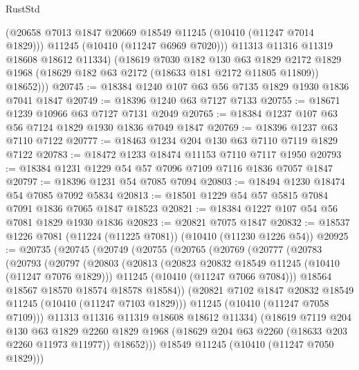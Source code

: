 \begin{lexlean}{RustStd}
\begin{coremodule}
            (@20658 @7013 @1847 @20669 @18549 @11245 (@10410 (@11247 @7014 @1829)))
            @11245
            (@10410 (@11247 @6969 @7020)))
          @11313
          @11316
          @11319
          @18608
          @18612
          @11334)
        (@18619
          @7030
          @182
          @130
          @63
          @1829
          @2172
          @1829
          @1968
          (@18629 @182 @63 @2172 (@18633 @181 @2172 @11805 @11809))
          @18652)))
@20745 := @18384 @1240 @107 @63 @56 @7135 @1829 @1930 @1836 @7041 @1847
@20749 := @18396 @1240 @63 @7127 @7133
@20755 := @18671 @1239 @10966 @63 @7127 @7131 @2049
@20765 := @18384 @1237 @107 @63 @56 @7124 @1829 @1930 @1836 @7049 @1847
@20769 := @18396 @1237 @63 @7110 @7122
@20777 := @18463 @1234 @204 @130 @63 @7110 @7119 @1829 @7122
@20783 := @18472 @1233 @18474 @11153 @7110 @7117 @1950
@20793 := @18384 @1231 @1229 @54 @57 @7096 @7109 @7116 @1836 @7057 @1847
@20797 := @18396 @1231 @54 @7085 @7094
@20803 := @18494 @1230 @18474 @54 @7085 @7092 @5834
@20813 := @18501 @1229 @54 @57 @5815 @7084 @7091 @1836 @7065 @1847 @18523
@20821 := @18384 @1227 @107 @54 @56 @7081 @1829 @1930 @1836
@20823 := @20821 @7075 @1847
@20832 := @18537 @1226 @7081 (@11224 (@11225 @7081)) (@10410 (@11230 @1226 @54))
@20925 := @20735
    (@20745
      (@20749
        (@20755
          (@20765
            (@20769
              (@20777
                (@20783
                  (@20793
                    (@20797
                      (@20803
                        (@20813
                          (@20823 @20832 @18549 @11245 (@10410 (@11247 @7076 @1829)))
                          @11245
                          (@10410 (@11247 @7066 @7084)))
                        @18564
                        @18567
                        @18570
                        @18574
                        @18578
                        @18584))
                    (@20821 @7102 @1847 @20832 @18549 @11245 (@10410 (@11247 @7103 @1829)))
                    @11245
                    (@10410 (@11247 @7058 @7109)))
                  @11313
                  @11316
                  @11319
                  @18608
                  @18612
                  @11334)
                (@18619
                  @7119
                  @204
                  @130
                  @63
                  @1829
                  @2260
                  @1829
                  @1968
                  (@18629 @204 @63 @2260 (@18633 @203 @2260 @11973 @11977))
                  @18652)))
            @18549
            @11245
            (@10410 (@11247 @7050 @1829)))

\end{coremodule}
\end{lexlean}
